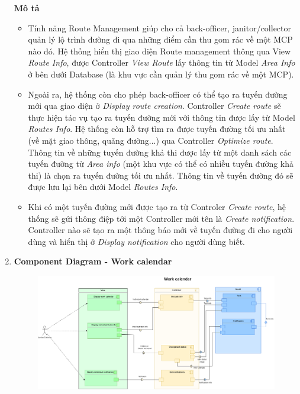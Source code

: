\documentclass[a4paper]{article}
\begin{document}
\begin{enumerate}
        \textbf{Mô tả}
        \begin{itemize}
            \item Tính năng Route Management giúp cho cả back-officer, janitor/collector quản lý lộ trình đường đi qua những điểm cần thu gom rác về một MCP nào đó. Hệ thống hiển thị giao diện Route management thông qua View \textit{ Route Info}, được Controller \textit{View Route} lấy thông tin từ Model \textit{Area Info} ở bên dưới Database (là khu vực cần quản lý thu gom rác về một MCP).
            \item Ngoài ra, hệ thống còn cho phép back-officer có thể tạo ra tuyến đường mới qua giao diện ở \textit{Display route creation}. Controller \textit{Create route} sẽ thực hiện tác vụ tạo ra tuyến đường mới với thông tin được lấy từ Model \textit{Routes Info}. Hệ thống còn hỗ trợ tìm ra được tuyến đường tối ưu nhất (về mặt giao thông, quãng đường...) qua Controller \textit{Optimize route}. Thông tin về những tuyến đường khả thi được lấy từ một danh sách các tuyến đường từ \textit{Area info} (một khu vực có thể có nhiều tuyến đường khả thi) là chọn ra tuyến đường tối ưu nhất. Thông tin về tuyến đường đó sẽ được lưu lại bên dưới Model \textit{Routes Info}.
            \item Khi có một tuyến đường mới được tạo ra từ Controler \textit{Create route}, hệ thống sẽ gửi thông điệp tới một Controller mới tên là \textit{Create notification}. Controller nào sẽ tạo ra một thông báo mới về tuyến đường đi cho người dùng và hiển thị ở \textit{Display notification} cho người dùng biết.
        \end{itemize}
     \item \textbf{Component Diagram - Work calendar}
     \newpage
     \begin{figure}[!h]
         \begin{center}
              \includegraphics[width=6in]{Image/WorkCalendarComponent.drawio.png}

\end{center}
\end{figure}
\end{enumerate}
\end{document}
